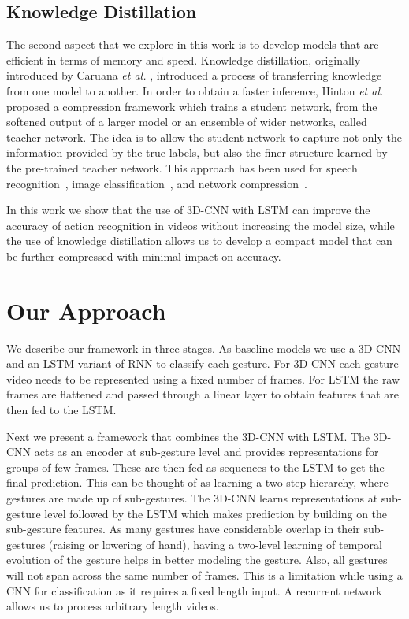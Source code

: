 \documentclass{article}
\begin{document}
\subsection{Knowledge Distillation}
\label{ssec:distillation}

The second aspect that we explore in this work is to develop models that are efficient in terms of memory and speed.
Knowledge distillation, originally introduced by Caruana \textit{et al.} \cite{DBLP:conf/kdd/BucilaCN06}, introduced a process of transferring knowledge from one model to another. In order to obtain a faster inference, Hinton \textit{et al.} \cite{2015arXiv150302531H} proposed a compression framework which trains a student network, from the softened output of a larger model or an ensemble of wider networks, called teacher network. The idea is to allow the student network to capture not only the information provided by the true labels, but also the finer structure learned by the pre-trained teacher network. This approach has been used for speech recognition~\cite{DBLP:journals/corr/ChanKL15}, image classification~\cite{DBLP:journals/corr/RomeroBKCGB14}, and network compression~\cite{2015arXiv150302531H}.

In this work we show that the use of 3D-CNN with LSTM can improve the accuracy of action recognition in videos without increasing the model size, while the use of knowledge distillation allows us to develop a compact model that can be further compressed with minimal impact on accuracy.

\section{Our Approach}
\label{sec:approach}

We describe our framework in three stages. As baseline models we use a 3D-CNN and an LSTM variant of RNN to classify each gesture. For 3D-CNN each gesture video needs to be represented using a fixed number of frames. For LSTM the raw frames are flattened and passed through a linear layer to obtain features that are then fed to the LSTM.

Next we present a framework that combines the 3D-CNN with LSTM. The 3D-CNN acts as an encoder at sub-gesture level and provides representations for groups of few frames. These are then fed as sequences to the LSTM to get the final prediction. This can be thought of as learning a two-step hierarchy, where gestures are made up of sub-gestures. The 3D-CNN learns representations at sub-gesture level followed by the LSTM which makes prediction by building on the sub-gesture features. As many gestures have considerable overlap in their sub-gestures (raising or lowering of hand), having a two-level learning of temporal evolution of the gesture helps in better modeling the gesture. Also, all gestures will not span across the same number of frames. This is a limitation while using a CNN for classification as it requires a fixed length input. A recurrent network allows us to process arbitrary length videos.
\end{document}
